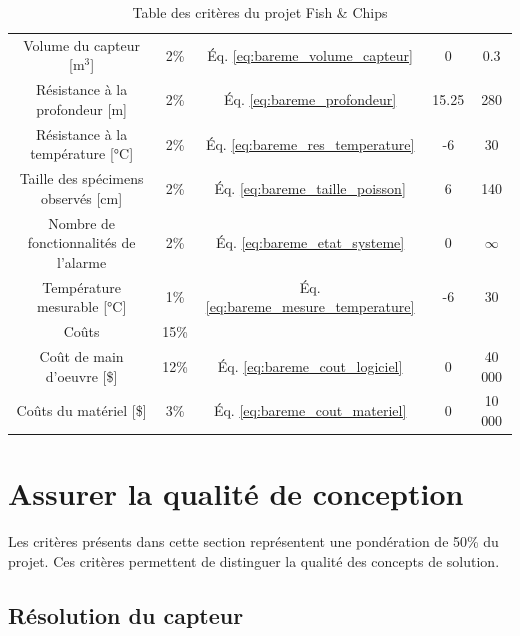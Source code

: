 \begin{table}[htp]
{\begin{tabular}{|c|c|c|c|c|}
        Volume du capteur [m$^3$] & 2\% & Éq. \ref{eq:bareme_volume_capteur} & 0 & 0.3\\
        Résistance à la profondeur [m] & 2\% & Éq. \ref{eq:bareme_profondeur} & 15.25 & 280\\
        Résistance à la température [°C] & 2\% & Éq. \ref{eq:bareme_res_temperature} & -6 & 30\\
        Taille des spécimens observés [cm] & 2\% & Éq. \ref{eq:bareme_taille_poisson} & 6 & 140\\
        Nombre de fonctionnalités de l'alarme & 2\% & Éq. \ref{eq:bareme_etat_systeme} & 0 & $\infty$\\
        Température mesurable [°C] & 1\% & Éq. \ref{eq:bareme_mesure_temperature} & -6 & 30\\
        \hline\hline
        Coûts & 15\% & & &\\
        \hline
        Coût de main d'oeuvre [\$] & 12\% & Éq. \ref{eq:bareme_cout_logiciel} & 0 & 40 000\\
        Coûts du matériel [\$] & 3\% & Éq. \ref{eq:bareme_cout_materiel} & 0 & 10 000 \\
        \hline
   \end{tabular}}
    \caption{Table des critères du projet Fish \& Chips}
    \label{t:criteres}
\end{table}



\newpage{}

\section{Assurer la qualité de conception}
Les critères présents dans cette section représentent une pondération de 50\% du projet. Ces critères permettent de distinguer la qualité des concepts de solution.  

\subsection{Résolution du capteur}


